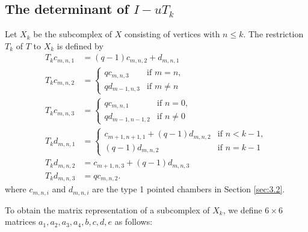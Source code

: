 \documentclass[11pt]{amsart}
\theoremstyle{definition}
\theoremstyle{remark}
\numberwithin{equation}{section}
\begin{document}
\subsection{The determinant of $I-uT_k$} Let $X_k$ be the subcomplex of $X$ consisting of vertices with $n\leq k$. The restriction $T_k$ of $T$ to $X_k$ is defined by 
\begin{align*}
T_k c_{m,n,1}&=(q-1)c_{m,n,2}+d_{m,n,1}\\
T_k c_{m,n,2}&=
\begin{cases}
qc_{m,n,3} & \text{if } m=n,\\
qd_{m-1,n,3} & \text{if } m\neq n
\end{cases}\\
T_k c_{m,n,3}&=
\begin{cases}
qc_{m,n,1} & \text{if } n=0,\\
qd_{m-1,n-1,2} & \text{if } n\neq 0
\end{cases}\\
T_k d_{m,n,1}&=
\begin{cases}
c_{m+1,n+1,1}+(q-1)d_{m,n,2} & \text{if } n<k-1,\\
(q-1)d_{m,n,2} & \text{if } n=k-1
\end{cases}\\
T_k d_{m,n,2}&=c_{m+1,n,3}+(q-1)d_{m,n,3}\\
T_k d_{m,n,3}&=qc_{m,n,2}.
\end{align*}
where $c_{m,n,i}$ and $d_{m,n,i}$ are the type 1 pointed chambers in Section \ref{sec:3.2}.

To obtain the matrix representation of a subcomplex of $X_k$, we define $6\times 6$ matrices $a_1,a_2,a_3,a_4,b,c,d,e$ as follows:
\end{document}
